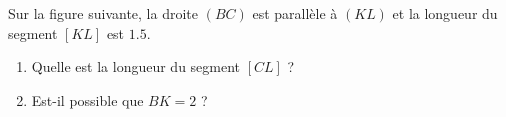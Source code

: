 
\begin{exercice}\label{exo2smath-0090}

    Sur la figure suivante, la droite \( (BC)\) est parallèle à \( (KL)\) et la longueur du segment \( [KL]\) est \( 1.5\).
\begin{center}
   
\end{center}

\begin{enumerate}
    \item
        Quelle est la longueur du segment \( [CL]\) ?
    \item
        Est-il possible que \( BK=2\) ?
\end{enumerate}

\end{exercice}
